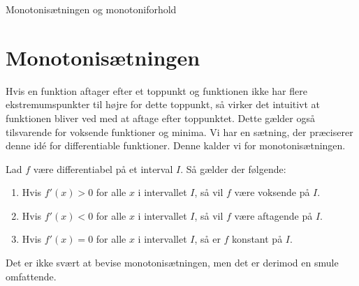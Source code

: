 \begin{center}
\Huge
Monotonisætningen og monotoniforhold
\end{center}
\section*{Monotonisætningen}
Hvis en funktion aftager efter et toppunkt og funktionen ikke har flere ekstremumspunkter til højre for dette toppunkt, så virker det intuitivt at funktionen bliver ved med at aftage efter toppunktet. Dette gælder også tilsvarende for voksende funktioner og minima. Vi har en sætning, der præciserer denne idé for differentiable funktioner. Denne kalder vi for monotonisætningen. 
\begin{setn}[Monotonisætningen]
Lad $f$ være differentiabel på et interval $I$. Så gælder der følgende:
\begin{enumerate}[label=\roman*)]
\item Hvis $f'(x)>0$ for alle $x$ i intervallet $I$, så vil $f$ være voksende på $I$.
\item Hvis $f'(x)<0$ for alle $x$ i intervallet $I$, så vil $f$ være aftagende på $I$. 
\item Hvis $f'(x)=0$ for alle $x$ i intervallet $I$, så er $f$ konstant på $I$.
\end{enumerate}
\end{setn}
Det er ikke svært at bevise monotonisætningen, men det er derimod en smule omfattende. 

